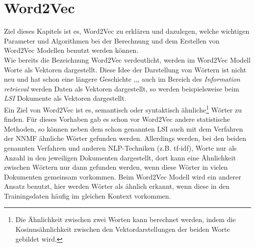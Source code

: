 \documentclass[12pt,a4paper]{report}
\begin{document}
\chapter{Word2Vec}
Ziel dieses Kapitels ist es, Word2Vec zu erklären und dazulegen, welche wichtigen Parameter und Algorithmen bei der Berechnung und dem Erstellen von Word2Vec Modellen benutzt werden können.\\
Wie bereits die Bezeichnung Word2Vec verdeutlicht, werden im Word2Vec Modell Worte als Vektoren dargestellt. Diese Idee der Darstellung von Wörtern ist nicht neu und hat schon eine längere Geschichte \cite{Hinton86},\cite{williams1986learning},\cite{elman1990finding}, auch im Bereich des \textit{Information retrieval} werden Daten als Vektoren dargestellt, so werden beispielsweise beim \textit{LSI} \cite{deerwester1990indexing} Dokumente als Vektoren dargestellt. \\
Ein Ziel von Word2Vec ist es, semantisch oder syntaktisch ähnliche\footnote{Die Ähnlichkeit zwischen zwei Worten kann berechnet werden, indem die Kosinusähnlichkeit zwischen den Vektordarstellungen der beiden Worte gebildet wird.} Wörter zu finden. Für dieses Vorhaben gab es schon vor Word2Vec andere statistische Methoden, so können neben dem schon genannten LSI auch mit dem Verfahren der NNMF ähnliche Wörter gefunden werden. Allerdings werden, bei den beiden genannten Verfahren und anderen NLP-Techniken (z.B. tf-idf), Worte nur als Anzahl in den jeweiligen Dokumenten dargestellt, dort kann eine Ähnlichkeit zwischen Wörtern nur dann gefunden werden, wenn diese Wörter in vielen Dokumenten gemeinsam vorkommen. Beim Word2Vec Modell wird ein anderer Ansatz benutzt, hier werden Wörter als ähnlich erkannt, wenn diese in den Trainingsdaten häufig im gleichen Kontext vorkommen.\\
\end{document}
